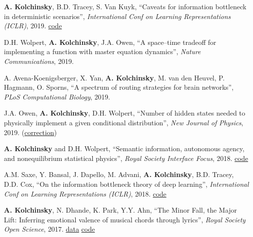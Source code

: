 \textbf{A. Kolchinsky}, B.D. Tracey, S. Van Kuyk, ``Caveats for information bottleneck in deterministic scenarios'', \emph{International Conf on Learning Representations (ICLR)}, 2019.  \href{https://github.com/artemyk/ibcurve}{code} 

D.H. Wolpert, \textbf{A. Kolchinsky}, J.A. Owen, ``A space–time tradeoff for implementing a function with master equation dynamics'', \emph{Nature Communications}, 2019.  

A. Avena-Koenigsberger, X. Yan, \textbf{A. Kolchinsky}, M. van den Heuvel, P. Hagmann, O. Sporns, ``A spectrum of routing strategies for brain networks'', \emph{PLoS Computational Biology}, 2019. 
 

J.A. Owen, \textbf{A. Kolchinsky}, D.H. Wolpert, ``Number of hidden states needed to physically implement a given conditional distribution'', \emph{New Journal of Physics}, 2019. (\href{https://iopscience.iop.org/article/10.1088/1367-2630/ab60f8}{correction}) 
 

\textbf{A. Kolchinsky} and D.H. Wolpert, ``Semantic information, autonomous agency, and nonequilibrium statistical physics'', \emph{Royal Society Interface Focus}, 2018.  \href{https://github.com/artemyk/semantic_information/}{code} 

A.M. Saxe, Y. Bansal, J. Dapello, M. Advani, \textbf{A. Kolchinsky}, B.D. Tracey, D.D. Cox, ``On the information bottleneck theory of deep learning'', \emph{International Conf on Learning Representations (ICLR)}, 2018.  \href{https://github.com/artemyk/ibsgd/tree/iclr2018}{code} 

\textbf{A. Kolchinsky}, N. Dhande, K. Park, Y.Y. Ahn, ``The Minor Fall, the Major Lift: Inferring emotional valence of musical chords through lyrics'', \emph{Royal Society Open Science}, 2017.  \href{https://doi.org/10.6084/m9.figshare.5413060.v1.}{data} \href{https://github.com/artemyk/chordsentiment}{code} 


